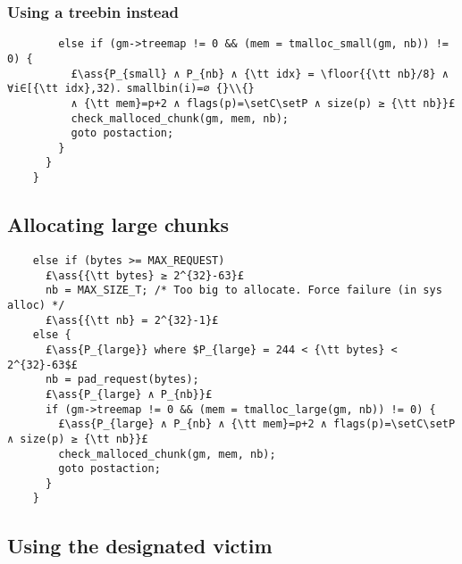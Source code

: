 \documentclass[10pt,a4paper,twoside]{report}
\makeatletter
\newcommand{\ml}[2][t]{\mbox{\mdseries\begin{tabular}[#1]{@{}L@{}}#2\end{tabular}}}
\newcommand{\ass}[1]{\ensuremath{{\color{blue}\left\{\ml[c]{#1}\right\}}}}
\renewcommand{\floor}[2][]{\left\lfloor{#2}\right\rfloor_{#1}}
\newcommand{\setC}{\raisebox{1.5pt}{$\blacktriangledown$}}
\newcommand{\setP}{{\blacktriangle}}
\makeatother
\begin{document}
\subsubsection*{Using a treebin instead}\label{sect:using_a_treebin_instead}

\begin{lstlisting}
        else if (gm->treemap != 0 && (mem = tmalloc_small(gm, nb)) != 0) {
          £\ass{P_{small} ∧ P_{nb} ∧ {\tt idx} = \floor{{\tt nb}/8} ∧ ∀i∈[{\tt idx},32)．smallbin(i)=∅ {}\\{}
          ∧ {\tt mem}=p+2 ∧ flags(p)=\setC\setP ∧ size(p) ≥ {\tt nb}}£
          check_malloced_chunk(gm, mem, nb);
          goto postaction;
        }
      }
    }
\end{lstlisting}

\subsection*{Allocating large chunks}\label{sect:allocating_large_chunks}

\begin{lstlisting}
    else if (bytes >= MAX_REQUEST)
      £\ass{{\tt bytes} ≥ 2^{32}-63}£
      nb = MAX_SIZE_T; /* Too big to allocate. Force failure (in sys alloc) */
      £\ass{{\tt nb} = 2^{32}-1}£
    else {
      £\ass{P_{large}} where $P_{large} = 244 < {\tt bytes} < 2^{32}-63$£
      nb = pad_request(bytes);
      £\ass{P_{large} ∧ P_{nb}}£
      if (gm->treemap != 0 && (mem = tmalloc_large(gm, nb)) != 0) {
        £\ass{P_{large} ∧ P_{nb} ∧ {\tt mem}=p+2 ∧ flags(p)=\setC\setP ∧ size(p) ≥ {\tt nb}}£
        check_malloced_chunk(gm, mem, nb);
        goto postaction;
      }
    }
\end{lstlisting}

\subsection*{Using the designated victim}\label{sect:using_the_designated_victim}
\end{document}
